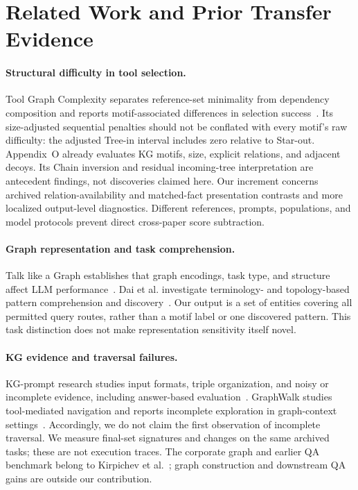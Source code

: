 \section{Related Work and Prior Transfer Evidence}
\label{sec:related}
\paragraph{Structural difficulty in tool selection.}
Tool Graph Complexity separates reference-set minimality from dependency composition and reports motif-associated differences in selection success~\cite{anonymousToolGraph}. Its size-adjusted sequential penalties should not be conflated with every motif's raw difficulty: the adjusted Tree-in interval includes zero relative to Star-out. Appendix~O already evaluates KG motifs, size, explicit relations, and adjacent decoys. Its Chain inversion and residual incoming-tree interpretation are antecedent findings, not discoveries claimed here. Our increment concerns archived relation-availability and matched-fact presentation contrasts and more localized output-level diagnostics. Different references, prompts, populations, and model protocols prevent direct cross-paper score subtraction.

\paragraph{Graph representation and task comprehension.}
Talk like a Graph establishes that graph encodings, task type, and structure affect LLM performance~\cite{fatemi2024talklikegraph}. Dai et al. investigate terminology- and topology-based pattern comprehension and discovery~\cite{dai2025graphpatterns}. Our output is a set of entities covering all permitted query routes, rather than a motif label or one discovered pattern. This task distinction does not make representation sensitivity itself novel.

\paragraph{KG evidence and traversal failures.}
KG-prompt research studies input formats, triple organization, and noisy or incomplete evidence, including answer-based evaluation~\cite{dai2024kgunderstanding}. GraphWalk studies tool-mediated navigation and reports incomplete exploration in graph-context settings~\cite{ghandi2026graphwalk}. Accordingly, we do not claim the first observation of incomplete traversal. We measure final-set signatures and changes on the same archived tasks; these are not execution traces. The corporate graph and earlier QA benchmark belong to Kirpichev et al.~\cite{kirpichev2026towards}; graph construction and downstream QA gains are outside our contribution.
